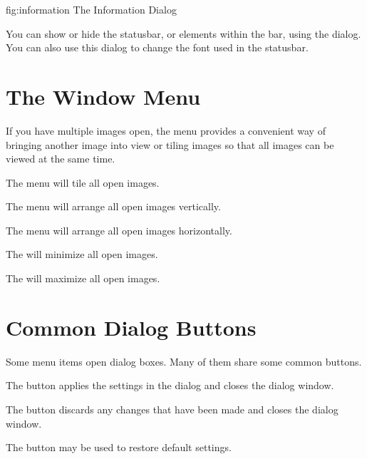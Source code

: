 \FloatFig
  {fig:information}
  {}
  {The Information Dialog}

You can show or hide the \gls*{statusbar}, or elements within the
bar, using the  dialog. You can also use this
dialog to change the font used in the \gls*{statusbar}.

\section{The Window Menu}\label{sec:thewindowmenu}

If you have multiple images open,
the  menu provides a convenient way of bringing 
another image into view or tiling images so that all images can be
viewed at the same time.


The  menu will tile all open images.


The  menu will arrange all open images
vertically.


The  menu will arrange all open images
horizontally.


The  will minimize all open images.


The  will maximize all open images.

\section{Common Dialog Buttons}\label{sec:commonwidgets}

Some menu items open dialog boxes. Many of them share some common
buttons.


The  button applies the settings in the dialog and
closes the dialog window.


The  button discards any changes that have been made
and closes the dialog window.


The  button may be used to restore default
settings.

